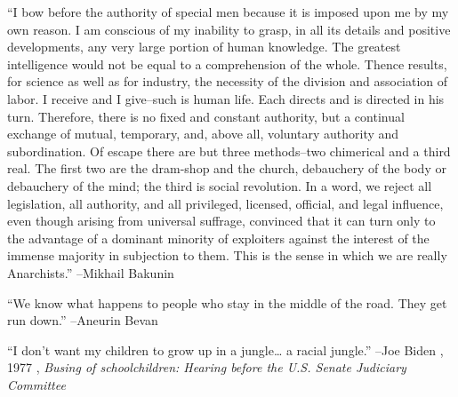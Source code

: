 \documentclass{article}%
\begin{document}
\linebreak%
\vspace{1mm}%
\begin{minipage}{\textwidth}%
\flushleft%
“I bow before the authority of special men because it is imposed upon me by my own reason. I am conscious of my inability to grasp, in all its details and positive developments, any very large portion of human knowledge. The greatest intelligence would not be equal to a comprehension of the whole. Thence results, for science as well as for industry, the necessity of the division and association of labor. I receive and I give–such is human life. Each directs and is directed in his turn. Therefore, there is no fixed and constant authority, but a continual exchange of mutual, temporary, and, above all, voluntary authority and subordination. Of escape there are but three methods–two chimerical and a third real. The first two are the dram{-}shop and the church, debauchery of the body or debauchery of the mind; the third is social revolution. In a word, we reject all legislation, all authority, and all  privileged, licensed, official, and legal influence, even though arising from universal suffrage, convinced that it can turn only to the advantage of a dominant minority of exploiters against the interest of the immense majority in subjection to them.  This is the sense in which we are really Anarchists.”%
\linebreak%
\vspace{1mm}%
–Mikhail Bakunin%
\linebreak%
\vspace{1mm}%
\end{minipage}%
\linebreak%
\vspace{1mm}%
\begin{minipage}{\textwidth}%
\flushleft%
“We know what happens to people who stay in the middle of the road. They get run down.”%
\linebreak%
\vspace{1mm}%
–Aneurin Bevan%
\linebreak%
\vspace{1mm}%
\end{minipage}%
\linebreak%
\vspace{1mm}%
\begin{minipage}{\textwidth}%
\flushleft%
“I don't want my children to grow up in a jungle… a racial jungle.”%
\linebreak%
\vspace{1mm}%
–Joe Biden%
, 1977%
, \textit{Busing of schoolchildren: Hearing before the U.S. Senate Judiciary Committee}%
\linebreak%
\vspace{1mm}%
\end{minipage}%
\end{document}
